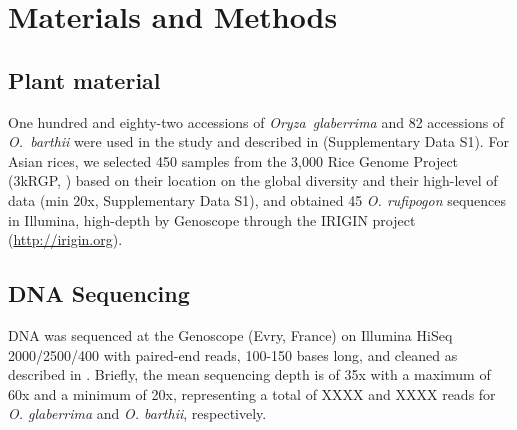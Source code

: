 \documentclass[10pt,letterpaper]{article}
\begin{document}
% 
% 

\section*{Materials and Methods}

\subsection*{Plant material}
One hundred and eighty-two accessions of \textit{Oryza~glaberrima} and 82 accessions of \textit{O.~barthii} were used in the study and described in \cite{Cubry2018} (Supplementary Data S1). For Asian rices, we selected 450 samples from the 3,000 Rice Genome Project (3kRGP, \cite{3kRGP}) based on their location on the global diversity and their high-level of data (min 20x, Supplementary Data S1), and obtained 45 \textit{O. rufipogon} sequences in Illumina, high-depth by Genoscope through the IRIGIN project (\url{http://irigin.org}). 

\subsection*{DNA Sequencing}
DNA was sequenced at the Genoscope (Evry, France) on Illumina HiSeq 2000/2500/400 with paired-end reads, 100-150 bases long, and cleaned as described in \cite{Cubry2018, Djedatin2017}. Briefly, the mean sequencing depth is of 35x with a maximum of 60x and a minimum of 20x, representing a total of XXXX and XXXX reads for \textit{O. glaberrima} and \textit{O. barthii}, respectively.
\end{document}
